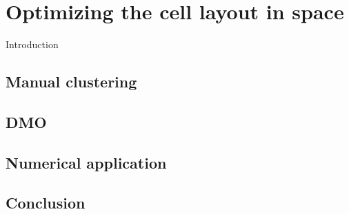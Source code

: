 \setchapterpreamble[u]{\margintoc}
\chapter{Optimizing the cell layout in space}
Introduction
\section{Manual clustering}

\section{DMO}

\section{Numerical application}

\section{Conclusion}